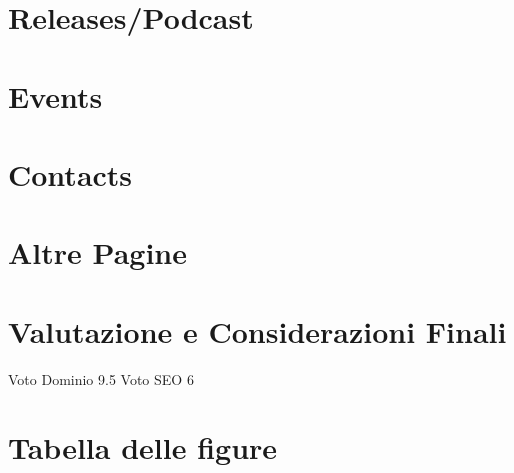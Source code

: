 \documentclass[10pt,a4paper]{article}
\begin{document}
\section{Releases/Podcast}
\section{Events}
\section{Contacts}
\section{Altre Pagine}
\section{Valutazione e Considerazioni Finali}
Voto Dominio 9.5
Voto SEO 6
\appendix
\section{Tabella delle figure}
\end{document}
